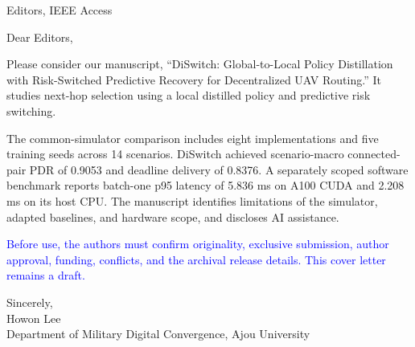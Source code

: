 \documentclass{article}
\begin{document}
Editors, IEEE Access

Dear Editors,

Please consider our manuscript, ``DiSwitch: Global-to-Local Policy Distillation with Risk-Switched Predictive Recovery for Decentralized UAV Routing.'' It studies next-hop selection using a local distilled policy and predictive risk switching.

The common-simulator comparison includes eight implementations and five training seeds across 14 scenarios. DiSwitch achieved scenario-macro connected-pair PDR of 0.9053 and deadline delivery of 0.8376. A separately scoped software benchmark reports batch-one p95 latency of 5.836 ms on A100 CUDA and 2.208 ms on its host CPU. The manuscript identifies limitations of the simulator, adapted baselines, and hardware scope, and discloses AI assistance.

\textcolor{blue}{Before use, the authors must confirm originality, exclusive submission, author approval, funding, conflicts, and the archival release details. This cover letter remains a draft.}

Sincerely,\\Howon Lee\\Department of Military Digital Convergence, Ajou University
\end{document}
